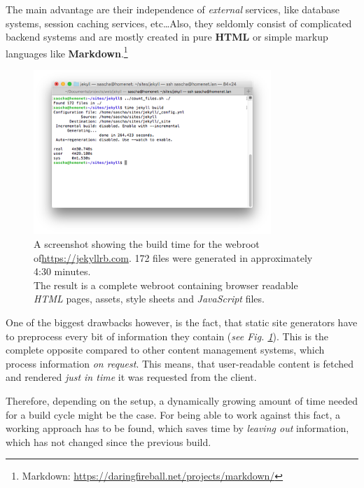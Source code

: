 \documentclass[a4paper,english,11pt]{report}
\begin{document}
The main advantage are their independence of \emph{external} services, like database systems, session caching services, etc\ldots\newline Also, they seldomly consist of complicated backend systems and are mostly created in pure \textbf{HTML} or simple markup languages like \textbf{Markdown}.\footnote{Markdown: \url{https://daringfireball.net/projects/markdown/}}
%
\begin{figure}[p]
    \centering
    \includegraphics[width=0.8\textwidth]{jekyll_build.png}
    \caption{A screenshot showing the build time for the webroot of\newline \url{https://jekyllrb.com}. 172 files were generated in approximately 4:30 minutes.\\ The result is a complete webroot containing browser readable \emph{HTML} pages, assets, style sheets and \emph{JavaScript} files.}
    \label{fig:jekyll_build}
\end{figure}
%

One of the biggest drawbacks however, is the fact, that static site generators have to preprocess every bit of information they contain (\emph{see Fig. \ref{fig:jekyll_build}}). This is the complete opposite compared to other content management systems, which process information \emph{on request}. This means, that user-readable content is fetched and rendered \emph{just in time} it was requested from the client.

Therefore, depending on the setup, a dynamically growing amount of time needed for a build cycle might be the case.
For being able to work against this fact, a working approach has to be found, which saves time by \emph{leaving out} information, which has not changed since the previous build.
%

\end{document}
